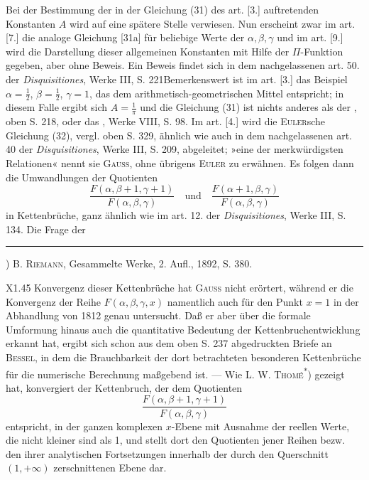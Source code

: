 \indent Bei der Bestimmung der in der Gleichung (31) des art. [3.] auftretenden Konstanten $A$ wird auf eine spätere Stelle verwiesen.
Nun erscheint zwar im art. [7.] die analoge Gleichung [31a] für beliebige Werte der $\alpha,\beta,\gamma$ und im art. [9.] wird die Darstellung dieser allgemeinen Konstanten mit Hilfe der $\Pi$-Funktion gegeben, aber ohne Beweis.
Ein Beweis findet sich in dem nachgelassenen art. 50. der \emph{Disquisitiones}, Werke III, S. 221\quad Bemerkenswert ist im art. [3.] das Beispiel $\alpha=\tfrac12$, $\beta=\tfrac12$, $\gamma=1$, das dem arithmetisch-geometrischen Mittel entspricht; in diesem Falle ergibt sich $A=\tfrac1\pi$ und die Gleichung (31) ist nichts anderes als der , oben S. 218, oder das , Werke VIII, S. 98.
Im art. [4.] wird die \textsc{Euler}sche Gleichung (32), vergl. oben S. 329, ähnlich wie auch in dem nachgelassenen art. 40 der \emph{Disquisitiones}, Werke III, S. 209, abgeleitet; »eine der merkwürdigsten Relationen« nennt sie \textsc{Gauss}, ohne übrigens \textsc{Euler} zu erwähnen.
Es folgen dann die Umwandlungen der Quotienten
\[
\frac{F(\alpha,\beta+1,\gamma+1)}{F(\alpha,\beta,\gamma)}\quad\text{und}\quad\frac{F(\alpha+1,\beta,\gamma)}{F(\alpha,\beta,\gamma)}
\]
\noindent in Kettenbrüche, ganz ähnlich wie im art. 12. der \emph{Disquisitiones}, Werke III, S. 134. Die Frage der
\par\medskip\noindent\rule{.25\linewidth}{.4pt}\par\smallskip
{\small\noindent *) B. \textsc{Riemann}, Gesammelte Werke, 2. Aufl., 1892, S. 380.\par}
\par\bigskip\noindent\small X1.\hfill45\normalsize
\clearpage{}
\noindent Konvergenz dieser Kettenbrüche hat \textsc{Gauss} nicht erörtert, während er die Konvergenz der Reihe $F(\alpha,\beta,\gamma,x)$ namentlich auch für den Punkt $x=1$ in der Abhandlung von 1812 genau untersucht.
Daß er aber über die formale Umformung hinaus auch die quantitative Bedeutung der Kettenbruchentwicklung erkannt hat, ergibt sich schon aus dem oben S. 237 abgedruckten Briefe an \textsc{Bessel}, in dem die Brauchbarkeit der dort betrachteten besonderen Kettenbrüche für die numerische Berechnung maßgebend ist. — Wie L. W. \textsc{Thomé}\textsuperscript{*}) gezeigt hat, konvergiert der Kettenbruch, der dem Quotienten
\[
\frac{F(\alpha,\beta+1,\gamma+1)}{F(\alpha,\beta,\gamma)}
\]
\noindent entspricht, in der ganzen komplexen $x$-Ebene mit Ausnahme der reellen Werte, die nicht kleiner sind als 1, und stellt dort den Quotienten jener Reihen bezw. den ihrer analytischen Fortsetzungen innerhalb der durch den Querschnitt $(1,+\infty)$ zerschnittenen Ebene dar.

